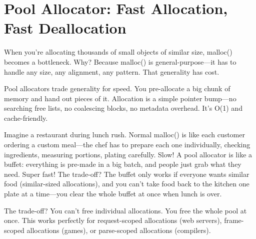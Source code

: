 \section{Pool Allocator: Fast Allocation, Fast Deallocation}

When you're allocating thousands of small objects of similar size, malloc() becomes a bottleneck. Why? Because malloc() is general-purpose---it has to handle any size, any alignment, any pattern. That generality has cost.

Pool allocators trade generality for speed. You pre-allocate a big chunk of memory and hand out pieces of it. Allocation is a simple pointer bump---no searching free lists, no coalescing blocks, no metadata overhead. It's O(1) and cache-friendly.

Imagine a restaurant during lunch rush. Normal malloc() is like each customer ordering a custom meal---the chef has to prepare each one individually, checking ingredients, measuring portions, plating carefully. Slow! A pool allocator is like a buffet: everything is pre-made in a big batch, and people just grab what they need. Super fast! The trade-off? The buffet only works if everyone wants similar food (similar-sized allocations), and you can't take food back to the kitchen one plate at a time---you clear the whole buffet at once when lunch is over.

The trade-off? You can't free individual allocations. You free the whole pool at once. This works perfectly for request-scoped allocations (web servers), frame-scoped allocations (games), or parse-scoped allocations (compilers).

